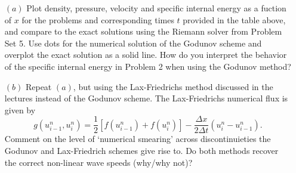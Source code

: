 \documentclass[letter,11pt]{article}
\begin{document}
\begin{itemize}
  \item[$(a)$] Plot density, pressure, velocity and specific internal energy as a fuction of $x$ for the problems and corresponding times $t$ provided in the table above, and compare to the exact solutions using the Riemann solver from Problem Set 5. Use dots for the numerical solution of the Godunov scheme and overplot the exact solution as a solid line. How do you interpret the behavior of the specific internal energy in Problem 2 when using the Godunov method?

  \item[$(b)$] Repeat $(a)$, but using the Lax-Friedrichs method discussed in the lectures instead of the Godunov scheme. The Lax-Friedrichs numerical flux is given by
  \begin{equation}
    g(u^n_{i-1}, u^n_{i}) = \frac{1}{2} \left[f(u^n_{i-1})+f(u^n_{i})\right] - \frac{\Delta x}{2\Delta t}(u^n_i - u^n_{i-1}).
  \end{equation}
  Comment on the level of `numerical smearing' across discontinuieties the Godunov and Lax-Friedrich schemes give rise to. Do both methods recover the correct non-linear wave speeds (why/why not)?

\end{itemize}
\end{document}
